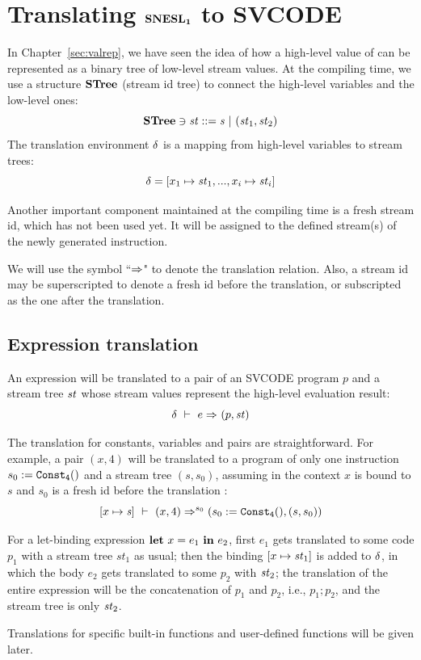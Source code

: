 \section{Translating $\mathbf{SNESL_1}$ to SVCODE}
In Chapter~\ref{sec:valrep}, we have seen the idea of how a high-level value of \mysnesl can be represented as a binary tree of low-level stream values.
At the compiling time, we use a structure $\mathbf{STree}$ (stream id tree) to connect the high-level variables and the low-level ones: 
$$ \STree \ni \st ::= \s \ | \ (\st_1,\st_2) $$
The translation environment $\delta$ is a mapping from high-level variables to stream trees:
 $$\del = [x_1 \|-> \st_1,..., x_i \|-> {\st_i}] $$ 

Another important component maintained at the compiling time is a fresh stream id, which has not been used yet. 
It will be assigned to the defined stream(s) of the newly generated instruction.

We will use the symbol ``$\Rightarrow$" to denote the translation relation. 
Also, a stream id may be superscripted to denote a fresh id before the translation, or subscripted as the one after the translation.

\subsection{Expression translation}


An \mysnesl expression will be translated to a pair of an SVCODE program $p$ and a stream tree $\mathit{st}$ whose stream values represent the high-level evaluation result:
$$ \delta \ \vdash\  e \Rightarrow^{}_{} (p,\mathit{st})$$

The translation for constants, variables and pairs are straightforward. For example, a pair $(x,4)$ will be translated to a program of only one instruction $s_0 := \mathtt{Const_{4}()}$ and a stream tree $(s,s_0)$, assuming in the context $x$ is bound to $s$ and $s_0$ is a fresh id before the translation :   
$$[x \|-> \s] \Env (x,4)  \Ra^{s_0} (s_0 := \constaf{4}, (s,s_0))$$ 

For a let-binding expression $\mathbf{let} \ x = e_1 \ \mathbf{in} \ e_2$,  first $e_1$ gets translated to some code $p_1$ with a stream tree $st_1$ as usual; then the binding $[x \|-> \st_1]$ is added to $\delta$, in which the body $e_2$ gets translated to some $p_2$ with $\mathit{st}_2$; the translation of the entire expression will be the concatenation of $p_1$ and $p_2$, i.e., $p_1;p_2$, and the stream tree is only $\mathit{st}_2$.

Translations for specific built-in functions and user-defined functions will be given later.

